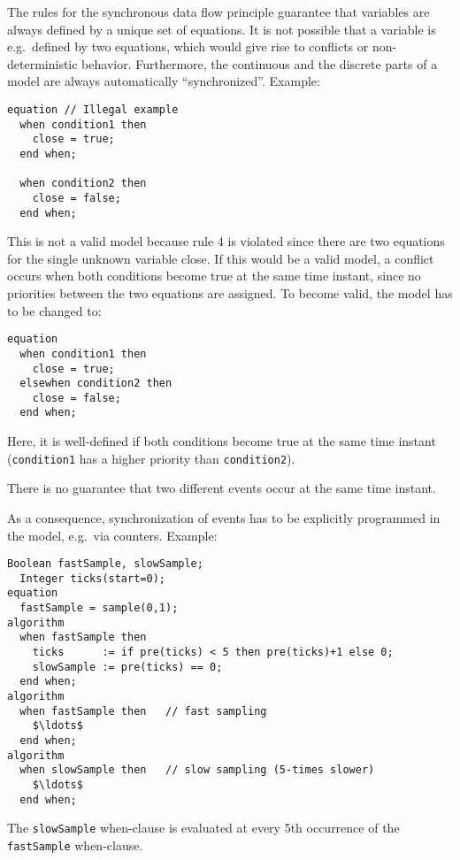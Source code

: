 \begin{nonnormative}
The rules for the synchronous data flow principle guarantee
that variables are always defined by a unique set of equations. It is
not possible that a variable is e.g.\ defined by two equations, which
would give rise to conflicts or non-deterministic behavior. Furthermore,
the continuous and the discrete parts of a model are always
automatically ``synchronized''. Example:
\begin{lstlisting}[language=modelica]
equation // Illegal example
  when condition1 then
    close = true;
  end when;

  when condition2 then
    close = false;
  end when;
\end{lstlisting}

This is not a valid model because rule 4 is violated since there
are two equations for the single unknown variable close. If this would
be a valid model, a conflict occurs when both conditions become true at
the same time instant, since no priorities between the two equations are
assigned. To become valid, the model has to be changed to:
\begin{lstlisting}[language=modelica]
equation
  when condition1 then
    close = true;
  elsewhen condition2 then
    close = false;
  end when;
\end{lstlisting}

Here, it is well-defined if both conditions become true at the
same time instant (\lstinline!condition1! has a higher priority than
\lstinline!condition2!).
\end{nonnormative}

There is no guarantee that two different events occur at the same time
instant.

\begin{nonnormative}
As a consequence, synchronization of events has to be
explicitly programmed in the model, e.g.\ via counters. Example:
\begin{lstlisting}[language=modelica]
  Boolean fastSample, slowSample;
  Integer ticks(start=0);
equation
  fastSample = sample(0,1);
algorithm
  when fastSample then
    ticks      := if pre(ticks) < 5 then pre(ticks)+1 else 0;
    slowSample := pre(ticks) == 0;
  end when;
algorithm
  when fastSample then   // fast sampling
    $\ldots$
  end when;
algorithm
  when slowSample then   // slow sampling (5-times slower)
    $\ldots$
  end when;
\end{lstlisting}

The \lstinline!slowSample! when-clause is evaluated at every 5th occurrence of the
\lstinline!fastSample! when-clause.
\end{nonnormative}

